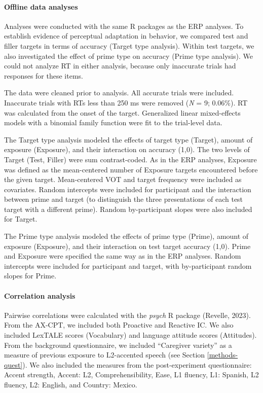 \documentclass[
  12pt,
  twoside]{article}
\begin{document}
\hypertarget{methods-off}{%
\paragraph{Offline data analyses}\label{methods-off}}

Analyses were conducted with the same R packages as the ERP analyses.
To establish evidence of perceptual adaptation in behavior, we compared test and filler targets in terms of accuracy (Target type analysis).
Within test targets, we also investigated the effect of prime type on accuracy (Prime type analysis).
We could not analyze RT in either analysis, because only inaccurate trials had responses for these items.

The data were cleaned prior to analysis.
All accurate trials were included.
Inaccurate trials with RTs less than 250 ms were removed (\emph{N} = 9; 0.06\%).
RT was calculated from the onset of the target.
Generalized linear mixed-effects models with a binomial family function were fit to the trial-level data.

The Target type analysis modeled the effects of target type (Target), amount of exposure (Exposure), and their interaction on accuracy (1,0).
The two levels of Target (Test, Filler) were sum contrast-coded.
As in the ERP analyses, Exposure was defined as the mean-centered number of Exposure targets encountered before the given target.
Mean-centered VOT and target frequency were included as covariates.
Random intercepts were included for participant and the interaction between prime and target (to distinguish the three presentations of each test target with a different prime).
Random by-participant slopes were also included for Target.

The Prime type analysis modeled the effects of prime type (Prime), amount of exposure (Exposure), and their interaction on test target accuracy (1,0).
Prime and Exposure were specified the same way as in the ERP analyses.
Random intercepts were included for participant and target, with by-participant random slopes for Prime.

\hypertarget{methods-corr-erp}{%
\paragraph{Correlation analysis}\label{methods-corr-erp}}

Pairwise correlations were calculated with the \emph{psych} R package (Revelle, 2023).
From the AX-CPT, we included both Proactive and Reactive IC.
We also included LexTALE scores (Vocabulary) and language attitude scores (Attitudes).
From the background questionnaire, we included ``Caregiver variety'' as a measure of previous exposure to L2-accented speech (see Section \ref{methods-quest}).
We also included the measures from the post-experiment questionnaire: Accent strength, Accent: L2, Comprehensibility, Ease, L1 fluency, L1: Spanish, L2 fluency, L2: English, and Country: Mexico.
\end{document}
